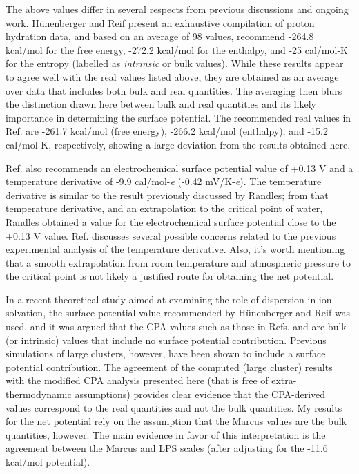 \begin{cpa}
  The above values differ in several respects from previous discussions and ongoing work. H\"{u}nenberger and Reif\cite{hunenberger2011sp} present an exhaustive compilation
  of proton hydration data, and based on an average of 98 values, recommend -264.8 kcal/mol for the free energy, -272.2 kcal/mol for the enthalpy, and -25 cal/mol-K for
  the entropy (labelled as \emph{intrinsic} or bulk values). While these results appear to agree well with the real values listed above, they are obtained as an
  average over data that includes both bulk and real quantities. The averaging then blurs the distinction drawn here between bulk and real quantities and its likely
  importance in determining the surface potential. The recommended real values in Ref. \cite{hunenberger2011sp} are -261.7 kcal/mol (free energy), -266.2 kcal/mol (enthalpy), 
  and -15.2 cal/mol-K, respectively, showing a large deviation from the results obtained here. 

  Ref. \cite{hunenberger2011sp} also recommends an electrochemical surface potential value of +0.13 V and a temperature derivative of -9.9 cal/mol-\emph{e} (-0.42 mV/K-\emph{e}). 
  The temperature derivative is similar to the result previously discussed by Randles\cite{randles1977structure}; from that temperature derivative, and an extrapolation to the
  critical point of water, Randles obtained a value for the electrochemical surface potential close to the +0.13 V value. Ref. \cite{hunenberger2011sp} discusses several possible
  concerns related to the previous experimental analysis of the temperature derivative. Also, it's worth mentioning that a smooth extrapolation from room temperature and 
  atmospheric pressure to the critical point is not likely a justified route for obtaining the net potential. 

  In a recent theoretical study aimed at examining the role of dispersion in ion solvation,\cite{duignan2013continuum2} the surface potential value recommended by H\"{u}nenberger
  and Reif\cite{hunenberger2011sp} was used, and it was argued that the CPA values such as those in Refs. \cite{coe1998cpa1} and \cite{donald2010expand_cpa} are bulk (or intrinsic)
  values that include no surface potential contribution. Previous simulations of large clusters, however, have been shown to include a surface potential 
  contribution\cite{beck2013sp,pollard2014cpa1}. The agreement of the computed (large cluster) results with the modified CPA analysis presented here (that is free of 
  extra-thermodynamic assumptions) provides clear evidence that the CPA-derived values correspond to the real quantities and not the bulk quantities. My results for the net
  potential rely on the assumption that the Marcus values are the bulk quantities, however. The main evidence in favor of this interpretation is the agreement between the 
  Marcus\cite{marcus1985book} and LPS\cite{ashbaugh2008lps} scales (after adjusting for the -11.6 kcal/mol potential).


\end{cpa}
